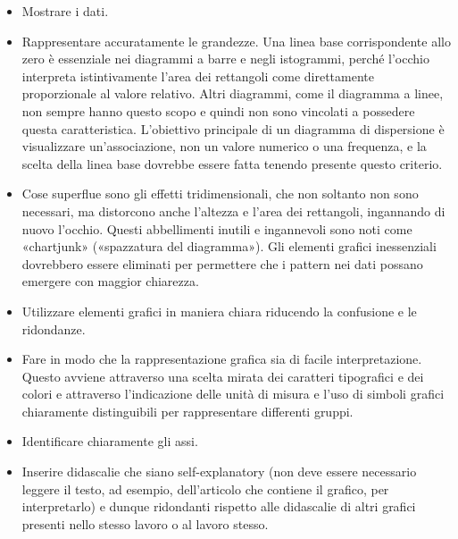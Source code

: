 \documentclass[drafts, 10pt]{book}
\begin{document}
\begin{itemize}
    \item Mostrare i dati.
    \item Rappresentare accuratamente le grandezze. Una linea base corrispondente allo zero è essenziale nei diagrammi a barre e negli istogrammi, perché l'occhio interpreta istintivamente l'area dei rettangoli come direttamente proporzionale al valore relativo. Altri diagrammi, come il diagramma a linee, non sempre hanno questo scopo e quindi non sono vincolati a possedere questa caratteristica. L'obiettivo principale di un diagramma di dispersione è visualizzare un'associazione, non un valore numerico o una frequenza, e la scelta della linea base dovrebbe essere fatta tenendo presente questo criterio.
    \item Cose superflue sono gli effetti tridimensionali, che non soltanto non sono necessari, ma distorcono anche l'altezza e l'area dei rettangoli, ingannando di nuovo l'occhio. Questi abbellimenti inutili e ingannevoli sono noti come «chartjunk» («spazzatura del diagramma»). Gli elementi grafici inessenziali dovrebbero essere eliminati per permettere che i pattern nei dati possano emergere con maggior chiarezza.
    \item Utilizzare elementi grafici in maniera chiara riducendo la confusione e le ridondanze.
    \item Fare in modo che la rappresentazione grafica sia di facile interpretazione. Questo avviene attraverso una scelta mirata dei caratteri tipografici e dei colori e attraverso l'indicazione delle unità di misura e l'uso di simboli grafici chiaramente distinguibili per rappresentare differenti gruppi.
    \item Identificare chiaramente gli assi.
    \item Inserire didascalie che siano self-explanatory (non deve essere necessario leggere il testo, ad esempio, dell’articolo che contiene il grafico, per interpretarlo) e dunque ridondanti rispetto alle didascalie di altri grafici presenti nello stesso lavoro o al lavoro stesso.
\end{itemize}
\end{document}
